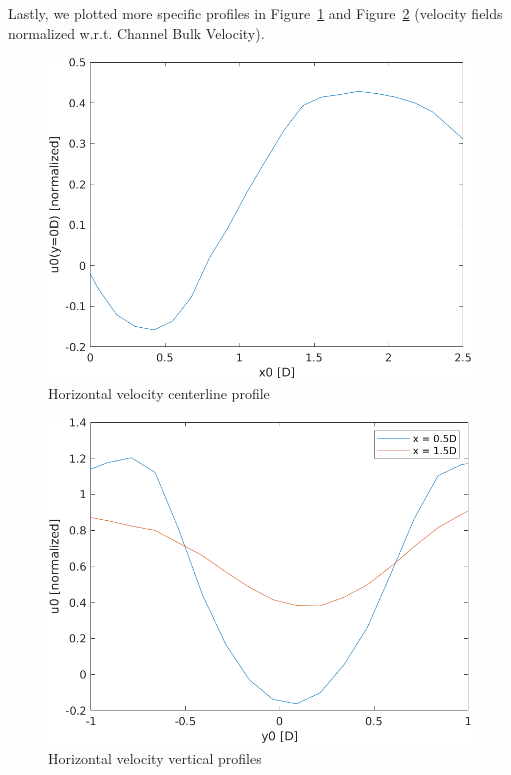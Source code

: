 \documentclass[12pt]{article}
\begin{document}
        Lastly, we plotted more specific profiles in Figure~\ref{fig:centerline_average} and Figure~\ref{fig:vertical_profiles} (velocity fields normalized w.r.t. Channel Bulk Velocity).

        \begin{figure}[ht!]
                \centering
                \includegraphics[width=\textwidth]{Centerline_Profile.png}
                \caption{Horizontal velocity centerline profile}
                \label{fig:centerline_average}
        \end{figure}

        \begin{figure}[ht!]
                \centering
                \includegraphics[width=\textwidth]{Vertical_Profiles.png}
                \caption{Horizontal velocity vertical profiles}
                \label{fig:vertical_profiles}
        \end{figure}
\end{document}
